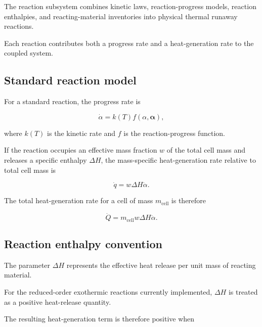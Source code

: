 The reaction subsystem combines kinetic laws, reaction-progress models,
reaction enthalpies, and reacting-material inventories into physical
thermal runaway reactions.

Each reaction contributes both a progress rate and a heat-generation
rate to the coupled system.


\subsection{Standard reaction model}

For a standard reaction, the progress rate is

\begin{equation}
    \dot{\alpha}
    =
    k(T)
    f
    \left(
        \alpha,
        \boldsymbol{\alpha}
    \right),
    \label{eq:reaction_progress}
\end{equation}

where $k(T)$ is the kinetic rate and $f$ is the reaction-progress
function.

If the reaction occupies an effective mass fraction $w$ of the total
cell mass and releases a specific enthalpy $\Delta H$, the
mass-specific heat-generation rate relative to total cell mass is

\begin{equation}
    \dot{q}
    =
    w
    \Delta H
    \dot{\alpha}.
    \label{eq:reaction_heat_specific}
\end{equation}

The total heat-generation rate for a cell of mass $m_{\mathrm{cell}}$
is therefore

\begin{equation}
    \dot{Q}
    =
    m_{\mathrm{cell}}
    w
    \Delta H
    \dot{\alpha}.
    \label{eq:reaction_heat_total}
\end{equation}


\subsection{Reaction enthalpy convention}

The parameter $\Delta H$ represents the effective heat release per unit
mass of reacting material.

For the reduced-order exothermic reactions currently implemented,
$\Delta H$ is treated as a positive heat-release quantity.

The resulting heat-generation term is therefore positive when

